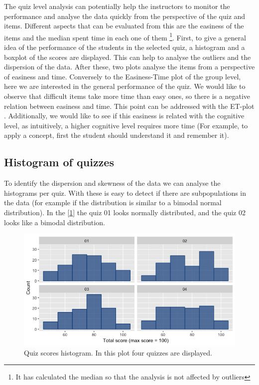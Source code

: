 The quiz level analysis can potentially help the instructors to monitor the performance and analyse the data quickly from the perspective of the quiz and items. Different aspects that can be evaluated from this are the easiness of the items and the median spent time in each one of them \footnote{It has calculated the median so that the analysis is not affected by outliers}. First, to give a general idea of the performance of the students in the selected quiz, a histogram and a boxplot of the scores are displayed. This can help to analyse the outliers and the dispersion of the data. After these, two plots analyse the items from a perspective of easiness and time. Conversely to the Easiness-Time plot of the group level, here we are interested in the general performance of the quiz. We would like to observe that difficult items take more time than easy ones, so there is a negative relation between easiness and time. This point can be addressed with the ET-plot \cite{Stefan2015b}. Additionally, we would like to see if this easiness is related with the cognitive level, as intuitively, a higher cognitive level requires more time (For example, to apply a concept, first the student should understand it and remember it).

\subsection{Histogram of quizzes}

To identify the dispersion and skewness of the data we can analyse the histograms per quiz. With these is easy to detect if there are subpopulations in the data (for example if the distribution is similar to a bimodal normal distribution). In the [\cref{img:quiz_hist}] the quiz 01 looks normally distributed, and the quiz 02 looks like a bimodal distribution.

\begin{figure}[ht!]
  \centering
  \includegraphics[width=.85\linewidth]{img/quiz_hist.png}
  \caption{Quiz scores histogram. In this plot four quizzes are displayed.}
  \label{img:quiz_hist}
\end{figure}

